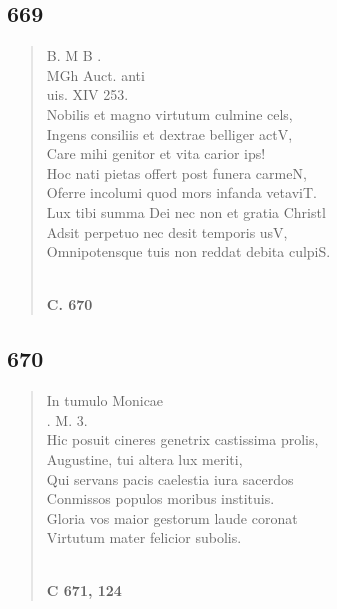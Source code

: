 \documentclass[11pt, a4paper]{report}
\begin{document}
            \subsection*{669}
      \begin{verse}
      B. M B . \\ MGh Auct. anti \\ uis. XIV 253. \\ Nobilis et magno virtutum culmine cels, \\ Ingens consiliis et dextrae belliger actV, \\ Care mihi genitor et vita carior ips! \\ Hoc nati pietas offert post funera carmeN, \\ Oferre incolumi quod mors infanda vetaviT. \\ Lux tibi summa Dei nec non et gratia Christl \\ Adsit perpetuo nec desit temporis usV, \\ Omnipotensque tuis non reddat debita culpiS. \\ 
        ﻿\pagebreak 
     \marginpar{[140]} \begin{center} \textbf{C. 670} \end{center}
      \end{verse}
  
            \subsection*{670}
      \begin{verse}
      In tumulo Monicae \\ . M. 3. \\ Hic posuit cineres genetrix castissima prolis, \\ Augustine, tui altera lux meriti, \\ Qui servans pacis caelestia iura sacerdos \\ Conmissos populos moribus instituis. \\ Gloria vos maior gestorum laude coronat \\ Virtutum mater felicior subolis. \\ 
        ﻿\pagebreak 
    \begin{center} \textbf{C 671, 124} \end{center} \marginpar{[141]} 
      \end{verse}
  
\end{document}
